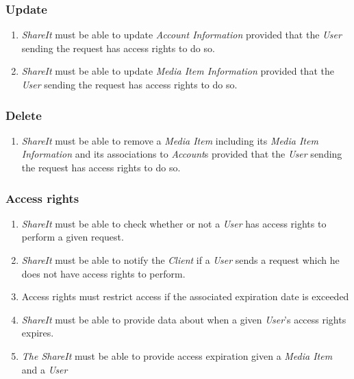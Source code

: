 \documentclass[../report.tex]{subfiles}
\begin{document}
\subsubsection{Update}
\begin{enumerate}[label=\textbf{FR-\twodigits*},resume]

\item \textit{ShareIt} must be able to update \textit{Account Information} provided that the \textit{User} sending the request has access rights to do so.

\item \textit{ShareIt} must be able to update \textit{Media Item Information} provided that the \textit{User} sending the request has access rights to do so.
\end{enumerate}

\subsubsection{Delete}
\begin{enumerate}[label=\textbf{FR-\twodigits*},resume]

\item \textit{ShareIt} must be able to remove a \textit{Media Item} including its \textit{Media Item Information} and its associations to \textit{Account}s provided that the \textit{User} sending the request has access rights to do so.

\end{enumerate}

\subsubsection{Access rights}
\begin{enumerate}[label=\textbf{FR-\twodigits*},resume]

\item \textit{ShareIt} must be able to check whether or not a \textit{User} has access rights to perform a given request.

\item \textit{ShareIt} must be able to notify the \textit{Client} if a \textit{User} sends a request which he does not have access rights to perform.

\item Access rights must restrict access if the associated expiration date is exceeded

\item \textit{ShareIt} must be able to provide data about when a given \textit{User}'s access rights expires.

\item \textit{The ShareIt} must be able to provide access expiration given a \textit{Media Item} and a \textit{User}

\end{enumerate}
\end{document}
